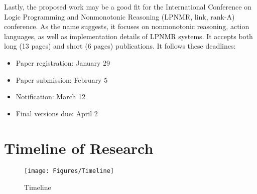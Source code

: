 Lastly, the proposed work may be a good fit for the International Conference on Logic Programming and Nonmonotonic Reasoning (LPNMR, link, rank-A) conference.
As the name suggests, it focuses on nonmonotonic reasoning, action languages, as well as implementation details of LPNMR systems.
It accepts both long (13 pages) and short (6 pages) publications.
It follows these deadlines:

\begin{itemize}
    \item Paper registration: January 29
    \item Paper submission: February 5
    \item Notification: March 12
    \item Final versions due: April 2
\end{itemize}

\section{Timeline of Research}

\begin{landscape}
    \begin{figure}[h]
        \centering
        \texttt{[image: Figures/Timeline]}
        \caption{Timeline}
        \label{fig:timeline}
    \end{figure}
\end{landscape}
